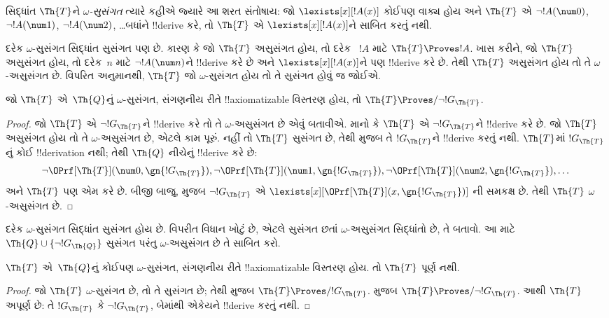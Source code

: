\documentclass[../../../include/open-logic-section]{subfiles}
\begin{document}
\begin{defn}
સિદ્ધાંત $\Th{T}$ને
\emph{$\omega$-સુસંગત}
ત્યારે કહીએ જ્યારે આ
શરત સંતોષાય: જો
$\lexists[x][!A(x)]$
કોઈપણ વાક્ય હોય અને
$\Th{T}$ એ
$\lnot
!A(\num 0)$,
$\lnot !A(\num 1)$,
$\lnot !A(\num 2)$,
\dots બધાંને
!!{derive} કરે,
તો $\Th{T}$ એ
$\lexists[x][!A(x)]$ને
સાબિત કરતું નથી.
\end{defn}

દરેક $\omega$-સુસંગત
સિદ્ધાંત સુસંગત પણ છે.
કારણ કે જો $\Th{T}$
અસુસંગત હોય, તો દરેક
~$!A$ માટે
$\Th{T} \Proves !A$.
ખાસ કરીને, જો
$\Th{T}$ અસુસંગત હોય,
તો દરેક~$n$ માટે
$\lnot !A(\num n)$ને
!!{derive} કરે છે અને
$\lexists[x][!A(x)]$ને
પણ !!{derive} કરે છે.
તેથી $\Th{T}$ અસુસંગત
હોય તો તે
$\omega$-અસુસંગત છે.
વિપરિત અનુમાનથી,
$\Th{T}$ જો
$\omega$-સુસંગત હોય
તો તે સુસંગત હોવું જ
જોઈએ.

\begin{lem}
જો $\Th{T}$ એ~$\Th{Q}$નું
$\omega$-સુસંગત,
સંગણનીય રીતે !!{axiomatizable} વિસ્તરણ
હોય, તો
$\Th{T} \Proves/ \lnot !G_\Th{T}$.
\end{lem}

\begin{proof}
જો $\Th{T}$ એ
$\lnot !G_\Th{T}$ને
!!{derive} કરે તો તે
$\omega$-અસુસંગત છે
એવું બતાવીએ. માનો કે
$\Th{T}$ એ
$\lnot !G_\Th{T}$ને
!!{derive} કરે છે.
જો $\Th{T}$ અસુસંગત
હોય તો તે
$\omega$-અસુસંગત છે,
એટલે કામ પૂરું.
નહીં તો $\Th{T}$
સુસંગત છે, તેથી
મુજબ તે $!G_\Th{T}$ને
!!{derive} કરતું નથી.
$\Th{T}$માં
$!G_\Th{T}$નું
કોઈ !!{derivation} નથી;
તેથી $\Th{Q}$ નીચેનું
!!{derive} કરે છે:
\[
\lnot \OPrf[\Th{T}](\num 0, \gn{!G_\Th{T}}), \lnot \OPrf[\Th{T}](\num 1,
\gn{!G_\Th{T}}), \lnot \OPrf[\Th{T}](\num 2, \gn{!G_\Th{T}}), \dots
\]
અને $\Th{T}$ પણ એમ
કરે છે. બીજી બાજુ,
 મુજબ
$\lnot
!G_\Th{T}$ એ
$\lexists[x][\OPrf[\Th{T}](x,\gn{!G_\Th{T}})]$
ની સમકક્ષ છે. તેથી
$\Th{T}$
$\omega$-અસુસંગત છે.
\end{proof}

\begin{prob}
  દરેક $\omega$-સુસંગત
  સિદ્ધાંત સુસંગત હોય છે.
  વિપરીત વિધાન ખોટું છે,
  એટલે સુસંગત છતાં
  $\omega$-અસુસંગત
  સિદ્ધાંતો છે, તે બતાવો.
  આ માટે $\Th{Q} \cup
  \{\lnot !G_\Th{Q}\}$
  સુસંગત પરંતુ
  $\omega$-અસુસંગત છે
  તે સાબિત કરો.
\end{prob}

\begin{thm}
$\Th{T}$ એ~$\Th{Q}$નું
કોઈપણ $\omega$-સુસંગત,
સંગણનીય રીતે !!{axiomatizable} વિસ્તરણ
હોય. તો $\Th{T}$ પૂર્ણ
નથી.
\end{thm}

\begin{proof}
  જો $\Th{T}$
  $\omega$-સુસંગત છે,
  તો તે સુસંગત છે; તેથી
  મુજબ $\Th{T}
  \Proves/ !G_\Th{T}$.
  મુજબ
  $\Th{T} \Proves/ \lnot !G_\Th{T}$.
  આથી $\Th{T}$ અપૂર્ણ
  છે: તે $!G_\Th{T}$
  કે $\lnot !G_\Th{T}$,
  બેમાંથી એકેયને
  !!{derive} કરતું નથી.
\end{proof}
\end{document}
